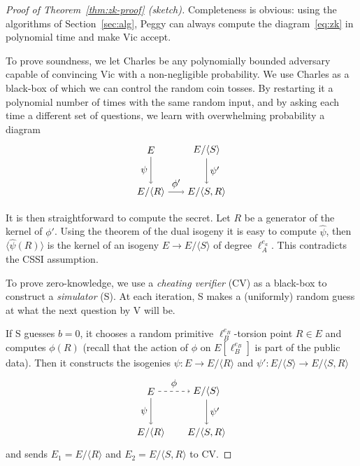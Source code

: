 \documentclass[jmc]{degruyter-journal-a}
\theoremstyle{definition}
\newcommand{\cyc}[1]{{\langle #1 \rangle}}
\begin{document}
\begin{proof}[Proof of Theorem~\ref{thm:zk-proof} (sketch)]
  Completeness is obvious: using the algorithms of
  Section~\ref{sec:alg}, Peggy can always compute the
  diagram~\eqref{eq:zk} in polynomial time and make Vic accept.

  To prove soundness, we let Charles be any polynomially bounded
  adversary capable of convincing Vic with a non-negligible
  probability. We use Charles as a black-box of which we can control
  the random coin tosses. By restarting it a polynomial number of
  times with the same random input, and by asking each time a different
  set of questions, we learn with overwhelming probability a diagram
  \begin{equation}
    \label{eq:zk1-soundness}
    \begin{tikzpicture}[xscale=2,yscale=1.5,baseline=(current bounding box.east)]
      \node(0) at (0,0) {$E$};
      \node(S) at (1,0) {$E/\cyc{S}$};
      \node(R) at (0,-1) {$E/\cyc{R}$};
      \node(SR) at (1,-1) {$E/\cyc{S,R}$};
            \path[->] (0) edge node[auto,swap] {$\psi$} (R);
      \path[->] (S) edge node[auto] {$\psi'$} (SR);
      \path[->] (R) edge node[auto] {$\phi'$} (SR);
    \end{tikzpicture}
  \end{equation}

  It is then straightforward to compute the secret. Let $R$ be a
  generator of the kernel of $\phi'$. Using the theorem of the dual
  isogeny it is easy to compute $\hat{\psi}$, then
  $\cyc{\hat{\psi}(R)}$ is the kernel of an isogeny $E\to E/\cyc{S}$
  of degree $\ell_A^{e_a}$. This contradicts the CSSI assumption.

  To prove zero-knowledge, we use a \emph{cheating verifier} (CV) as a
  black-box to construct a \emph{simulator} (S). At each iteration, S
  makes a (uniformly) random guess at what the next question by V will
  be.

  If S guesses $b=0$, it chooses a random primitive
  $\ell_B^{e_B}$-torsion point $R\in E$ and computes $\phi(R)$ (recall
  that the action of $\phi$ on $E[\ell_B^{e_B}]$ is part of the public
  data). Then it constructs the isogenies $\psi:E\to E/\cyc{R}$ and
  $\psi':E/\cyc{S}\to E/\cyc{S,R}$
  \begin{equation}
    \label{eq:zk2-vertical}
    \begin{tikzpicture}[xscale=2,yscale=1.5,baseline=(current bounding box.east)]
      \node(0) at (0,0) {$E$};
      \node(S) at (1,0) {$E/\cyc{S}$};
      \node(R) at (0,-1) {$E/\cyc{R}$};
      \node(SR) at (1,-1) {$E/\cyc{S,R}$};
      \path[->,dashed] (0) edge node[auto] {$\phi$} (S);
      \path[->] (0) edge node[auto,swap] {$\psi$} (R);
      \path[->] (S) edge node[auto] {$\psi'$} (SR);
    \end{tikzpicture}
  \end{equation}
  and sends $E_1=E/\cyc{R}$ and $E_2=E/\cyc{S,R}$ to CV.
  

\end{proof}
\end{document}
